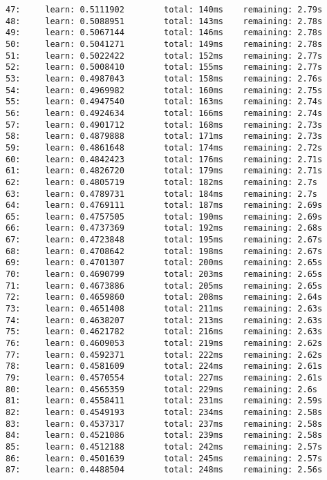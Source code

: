 \documentclass[11pt]{article}
\begin{document}
\begin{Verbatim}[commandchars=\\\{\}]
47:     learn: 0.5111902        total: 140ms    remaining: 2.79s
48:     learn: 0.5088951        total: 143ms    remaining: 2.78s
49:     learn: 0.5067144        total: 146ms    remaining: 2.78s
50:     learn: 0.5041271        total: 149ms    remaining: 2.78s
51:     learn: 0.5022422        total: 152ms    remaining: 2.77s
52:     learn: 0.5008410        total: 155ms    remaining: 2.77s
53:     learn: 0.4987043        total: 158ms    remaining: 2.76s
54:     learn: 0.4969982        total: 160ms    remaining: 2.75s
55:     learn: 0.4947540        total: 163ms    remaining: 2.74s
56:     learn: 0.4924634        total: 166ms    remaining: 2.74s
57:     learn: 0.4901712        total: 168ms    remaining: 2.73s
58:     learn: 0.4879888        total: 171ms    remaining: 2.73s
59:     learn: 0.4861648        total: 174ms    remaining: 2.72s
60:     learn: 0.4842423        total: 176ms    remaining: 2.71s
61:     learn: 0.4826720        total: 179ms    remaining: 2.71s
62:     learn: 0.4805719        total: 182ms    remaining: 2.7s
63:     learn: 0.4789731        total: 184ms    remaining: 2.7s
64:     learn: 0.4769111        total: 187ms    remaining: 2.69s
65:     learn: 0.4757505        total: 190ms    remaining: 2.69s
66:     learn: 0.4737369        total: 192ms    remaining: 2.68s
67:     learn: 0.4723848        total: 195ms    remaining: 2.67s
68:     learn: 0.4708642        total: 198ms    remaining: 2.67s
69:     learn: 0.4701307        total: 200ms    remaining: 2.65s
70:     learn: 0.4690799        total: 203ms    remaining: 2.65s
71:     learn: 0.4673886        total: 205ms    remaining: 2.65s
72:     learn: 0.4659860        total: 208ms    remaining: 2.64s
73:     learn: 0.4651408        total: 211ms    remaining: 2.63s
74:     learn: 0.4638207        total: 213ms    remaining: 2.63s
75:     learn: 0.4621782        total: 216ms    remaining: 2.63s
76:     learn: 0.4609053        total: 219ms    remaining: 2.62s
77:     learn: 0.4592371        total: 222ms    remaining: 2.62s
78:     learn: 0.4581609        total: 224ms    remaining: 2.61s
79:     learn: 0.4570554        total: 227ms    remaining: 2.61s
80:     learn: 0.4565359        total: 229ms    remaining: 2.6s
81:     learn: 0.4558411        total: 231ms    remaining: 2.59s
82:     learn: 0.4549193        total: 234ms    remaining: 2.58s
83:     learn: 0.4537317        total: 237ms    remaining: 2.58s
84:     learn: 0.4521086        total: 239ms    remaining: 2.58s
85:     learn: 0.4512188        total: 242ms    remaining: 2.57s
86:     learn: 0.4501639        total: 245ms    remaining: 2.57s
87:     learn: 0.4488504        total: 248ms    remaining: 2.56s

\end{Verbatim}
\end{document}
